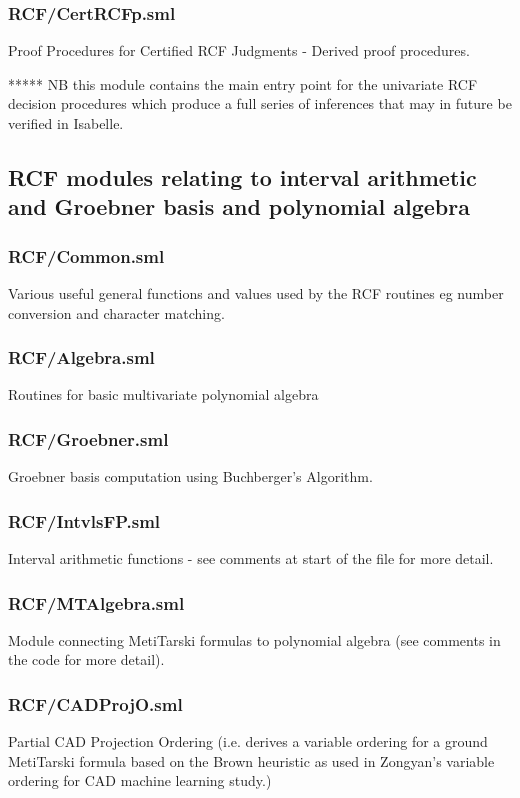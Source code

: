 \documentclass[11pt, oneside]{article}   	%
\begin{document}
\subsubsection{RCF/CertRCFp.sml}
Proof Procedures for Certified RCF Judgments - Derived proof procedures.

***** NB this module contains the main entry point for the univariate RCF decision procedures which produce a full series of inferences that
may in future be verified in Isabelle.


\subsection{RCF modules relating to interval arithmetic and Groebner basis and polynomial algebra}

\subsubsection{RCF/Common.sml}
Various useful general functions and values used by the RCF routines eg number conversion and character matching.
\subsubsection{RCF/Algebra.sml}
Routines for basic multivariate polynomial algebra
\subsubsection{RCF/Groebner.sml}
 Groebner basis computation using Buchberger's Algorithm.
\subsubsection{RCF/IntvlsFP.sml}
Interval arithmetic functions - see comments at start of the file for more detail.
\subsubsection{RCF/MTAlgebra.sml}
Module connecting MetiTarski formulas to polynomial algebra (see comments in the code for more detail).

\subsubsection{RCF/CADProjO.sml}
Partial CAD Projection Ordering (i.e. derives a variable ordering for a ground MetiTarski formula based
on the Brown heuristic as used in Zongyan's variable ordering for CAD machine learning study.)
\end{document}
